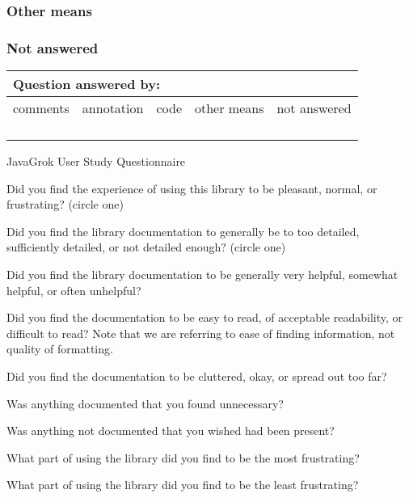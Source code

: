 \documentclass{article}
\let\Enumerate =\enumerate
\def\Nospacing{\itemsep=0pt\topsep=0pt\partopsep=0pt\parskip=0pt\parsep=0pt}
\renewenvironment{enumerate}{\Enumerate\Nospacing}{\endlist}
\begin{document}
\subsubsection*{Other means}
\subsubsection*{Not answered}

\begin{tabular*}{\textwidth}{| p{} | p{} |
    p{} | p{} | p{} | }
  \hline
  \multicolumn{5}{|l|}{Question answered by:} \\ \hline
  comments & annotation & code & other means & not answered \\ \hline
   &  & &  & \\
   &  & &  & \\
   &  & &  & \\
   &  & &  & \\
  \hline
\end{tabular*}

\newpage

\begin{center}
\LARGE JavaGrok User Study Questionnaire
\end{center}

\begin{enumerate}
\item Did you find the experience of using this library to be pleasant, normal,
or frustrating? (circle one)\\
\item Did you find the library documentation to generally be to too detailed, sufficiently
detailed, or not detailed enough? (circle one)\\
\item Did you find the library documentation to be generally very helpful,
somewhat helpful, or often unhelpful?\\
\item Did you find the documentation to be easy to read, of acceptable
readability, or difficult to read?  Note that we are referring to ease of
finding information, not quality of formatting.\\
\item Did you find the documentation to be cluttered, okay, or spread out too
far?\\
\item Was anything documented that you found unnecessary?\\\vspace{1in}
\item Was anything not documented that you wished had been present?\\\vspace{1in}
\item What part of using the library did you find to be the most
frustrating?\\\vspace{1in}
\item What part of using the library did you find to be the least
frustrating?\\\vspace{1in}
\end{enumerate}
\end{document}
